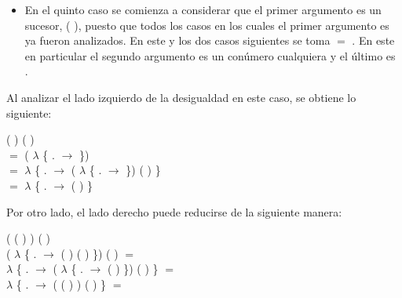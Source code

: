 \begin{AgdaAlign}
\begin{itemize}
\item En el quinto caso se comienza a considerar que el primer argumento es un sucesor, ( ), puesto que todos los casos en los cuales el primer argumento es  ya fueron analizados. En este y los dos casos siguientes se toma  $=$ . En este en particular el segundo argumento es un conúmero cualquiera  y el último es .
\end{itemize}

Al analizar el lado izquierdo de la desigualdad en este caso, se obtiene lo siguiente:

 (  \AgdaFunction{+} ) ( \AgdaFunction{+} ) \\
$=$  ( $\lambda$ \{ . $\rightarrow$   \AgdaFunction{+}  \})  \\
$=$  $\lambda$ \{ . $\rightarrow$  ( $\lambda$ \{ . $\rightarrow$   \AgdaFunction{+}  \}) ( ) \} \\
$=$  $\lambda$ \{ . $\rightarrow$  (  \AgdaFunction{+} )  \}

Por otro lado, el lado derecho puede reducirse de la siguiente manera:

\begin{flushright}
( ( ) ) \AgdaFunction{+} (  ) \\
( $\lambda$ \{ . $\rightarrow$  ( ) ( ) \}) \AgdaFunction{+} (  ) $=$ \\
 $\lambda$ \{ . $\rightarrow$ ( $\lambda$ \{ . $\rightarrow$  ( )  \}) \AgdaFunction{+} (  ) \} $=$ \\
 $\lambda$ \{ . $\rightarrow$ ( ( ) ) \AgdaFunction{+} (  ) \} $=$
\end{flushright}


\end{AgdaAlign}
